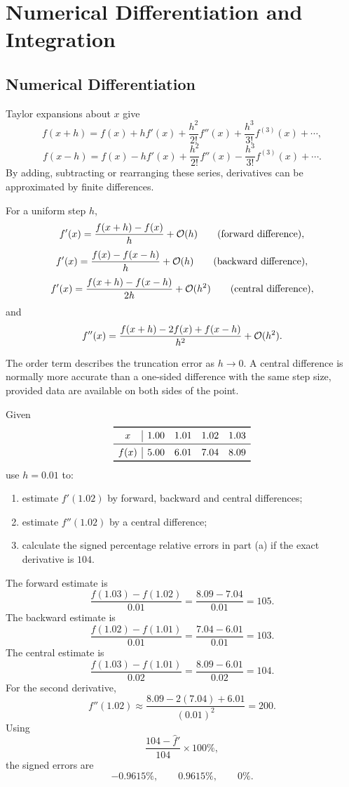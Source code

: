 \chapter{Numerical Differentiation and Integration}

\section{Numerical Differentiation}

Taylor expansions about $x$ give
\[
 f(x+h)=f(x)+hf'(x)+\frac{h^2}{2!}f''(x)
 +\frac{h^3}{3!}f^{(3)}(x)+\cdots,
\]
\[
 f(x-h)=f(x)-hf'(x)+\frac{h^2}{2!}f''(x)
 -\frac{h^3}{3!}f^{(3)}(x)+\cdots.
\]
By adding, subtracting or rearranging these series, derivatives can be approximated by finite differences.

\begin{definition}
For a uniform step $h$,
\[
 f'(x)=\frac{f(x+h)-f(x)}h+\mathcal O(h)
 \qquad\text{(forward difference)},
\]
\[
 f'(x)=\frac{f(x)-f(x-h)}h+\mathcal O(h)
 \qquad\text{(backward difference)},
\]
\[
 f'(x)=\frac{f(x+h)-f(x-h)}{2h}+\mathcal O(h^2)
 \qquad\text{(central difference)},
\]
and
\[
 f''(x)=\frac{f(x+h)-2f(x)+f(x-h)}{h^2}+\mathcal O(h^2).
\]
\end{definition}

The order term describes the truncation error as $h\to0$.  A central difference is normally more accurate than a one-sided difference with the same step size, provided data are available on both sides of the point.

\begin{example}
Given
\[
\begin{array}{c|cccc}
\toprule
x&1.00&1.01&1.02&1.03\\
\midrule
f(x)&5.00&6.01&7.04&8.09\\
\bottomrule
\end{array}
\]
use $h=0.01$ to:
\begin{enumerate}[label=(\alph*),leftmargin=2.7em]
  \item estimate $f'(1.02)$ by forward, backward and central differences;
  \item estimate $f''(1.02)$ by a central difference;
  \item calculate the signed percentage relative errors in part (a) if the exact derivative is $104$.
\end{enumerate}
\end{example}

\begin{solution}[7.0cm]
The forward estimate is
\[
 \frac{f(1.03)-f(1.02)}{0.01}
 =\frac{8.09-7.04}{0.01}=105.
\]
The backward estimate is
\[
 \frac{f(1.02)-f(1.01)}{0.01}
 =\frac{7.04-6.01}{0.01}=103.
\]
The central estimate is
\[
 \frac{f(1.03)-f(1.01)}{0.02}
 =\frac{8.09-6.01}{0.02}=104.
\]
For the second derivative,
\[
 f''(1.02)\approx
 \frac{8.09-2(7.04)+6.01}{(0.01)^2}=200.
\]
Using
\[
 \frac{104-\widehat f'}{104}\times100\%,
\]
the signed errors are
\[
 -0.9615\%,
 \qquad 0.9615\%,
 \qquad 0\%.
\]
\end{solution}

